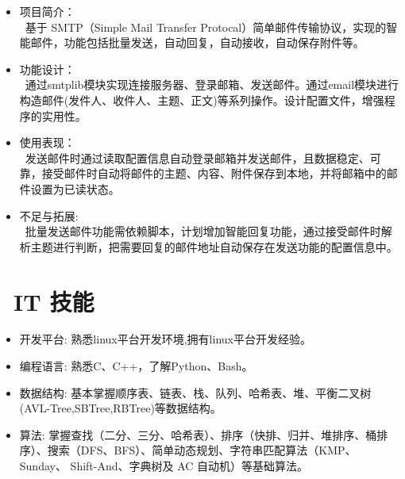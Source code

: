 \documentclass{resume}
\begin{document}
\begin{onehalfspacing}
	\begin{itemize}
		\item 项目简介：
		\\~基于 SMTP（Simple Mail Transfer Protocal）简单邮件传输协议，实现的智能邮件，功能包括批量发送，自动回复，自动接收，自动保存附件等。
		\item 功能设计：
		\\~通过smtplib模块实现连接服务器、登录邮箱、发送邮件。通过email模块进行构造邮件(发件人、收件人、主题、正文)等系列操作。设计配置文件，增强程序的实用性。
		\item 使用表现：
		\\~发送邮件时通过读取配置信息自动登录邮箱并发送邮件，且数据稳定、可靠，接受邮件时自动将邮件的主题、内容、附件保存到本地，并将邮箱中的邮件设置为已读状态。
		\item 不足与拓展:
		\\~批量发送邮件功能需依赖脚本，计划增加智能回复功能，通过接受邮件时解析主题进行判断，把需要回复的邮件地址自动保存在发送功能的配置信息中。		
	\end{itemize}
\end{onehalfspacing}

\section{\faCogs\ IT 技能}
\begin{itemize}[parsep=0.5ex]
	\item 开发平台: 熟悉linux平台开发环境,拥有linux平台开发经验。
	\item 编程语言: 熟悉C、C++，了解Python、Bash。
	\item 数据结构: 基本掌握顺序表、链表、栈、队列、哈希表、堆、平衡二叉树(AVL-Tree,SBTree,RBTree)等数据结构。
	\item 算法: 掌握查找（二分、三分、哈希表）、排序（快排、归并、堆排序、桶排序）、搜索（DFS、BFS）、简单动态规划、字符串匹配算法（KMP、Sunday、
Shift-And、字典树及 AC 自动机）等基础算法。
\end{itemize}
\end{document}
